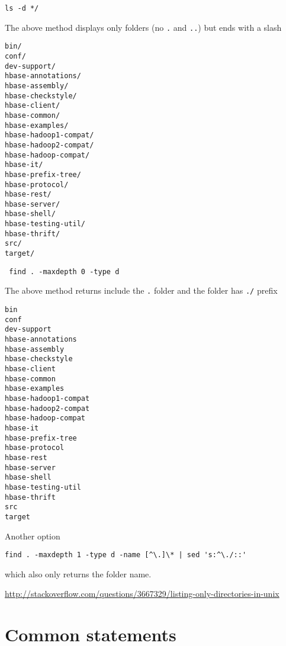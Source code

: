 \begin{verbatim}
ls -d */
\end{verbatim}
The above method displays only folders (no \verb!.! and \verb!..!) but ends with
a slash
\begin{verbatim}
bin/
conf/
dev-support/
hbase-annotations/
hbase-assembly/
hbase-checkstyle/
hbase-client/
hbase-common/
hbase-examples/
hbase-hadoop1-compat/
hbase-hadoop2-compat/
hbase-hadoop-compat/
hbase-it/
hbase-prefix-tree/
hbase-protocol/
hbase-rest/
hbase-server/
hbase-shell/
hbase-testing-util/
hbase-thrift/
src/
target/
\end{verbatim}


\begin{verbatim}
 find . -maxdepth 0 -type d
\end{verbatim}
The above method returns include the \verb!.! folder and the folder has
\verb!./! prefix
\begin{verbatim}
bin
conf
dev-support
hbase-annotations
hbase-assembly
hbase-checkstyle
hbase-client
hbase-common
hbase-examples
hbase-hadoop1-compat
hbase-hadoop2-compat
hbase-hadoop-compat
hbase-it
hbase-prefix-tree
hbase-protocol
hbase-rest
hbase-server
hbase-shell
hbase-testing-util
hbase-thrift
src
target
\end{verbatim}

Another option
\begin{verbatim}
find . -maxdepth 1 -type d -name [^\.]\* | sed 's:^\./::'
\end{verbatim}
which also only returns the folder name.

\url{http://stackoverflow.com/questions/3667329/listing-only-directories-in-unix}

\section{Common statements}
\label{sec:common-statements}

